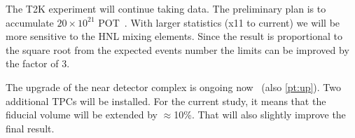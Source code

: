 \documentclass[../main.tex]{subfiles}
\begin{document}
The T2K experiment will continue taking data. The preliminary plan is to accumulate $20\times10^{21}$ POT~\cite{Abe2016e}. With larger statistics (x11 to current) we will be more sensitive to the HNL mixing elements. Since the result is proportional to the square root from the expected events number the limits can be improved by the factor of 3.

The upgrade of the near detector complex is ongoing now~\cite{Abe2019} (also \autoref{pt:up}). Two additional TPCs will be installed. For the current study, it means that the fiducial volume will be extended by $\approx$10\%. That will also slightly improve the final result.
\end{document}
